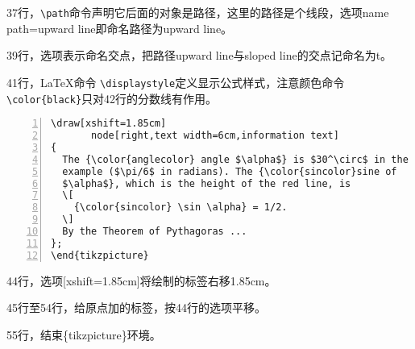 \documentclass[UTF8]{ctexart}
\begin{document}
37行，\verb!\path!命令声明它后面的对象是路径，这里的路径是个线段，选项name path=upward line即命名路径为upward line。

39行，选项表示命名交点，把路径upward line与sloped line的交点记命名为t。

41行，\LaTeX 命令 \verb!\displaystyle!定义显示公式样式，注意颜色命令 \verb!\color{black}!只对42行的分数线有作用。


\begin{lstlisting}[name=example-1,numbers=left,    numberstyle=\footnotesize]
\draw[xshift=1.85cm]
       node[right,text width=6cm,information text]
{
  The {\color{anglecolor} angle $\alpha$} is $30^\circ$ in the
  example ($\pi/6$ in radians). The {\color{sincolor}sine of
  $\alpha$}, which is the height of the red line, is
  \[
    {\color{sincolor} \sin \alpha} = 1/2.
  \]
  By the Theorem of Pythagoras ...
};
\end{tikzpicture}
\end{lstlisting}

44行，选项[xshift=1.85cm]将绘制的标签右移1.85cm。

45行至54行，给原点加的标签，按44行的选项平移。

55行，结束\{tikzpicture\}环境。
\end{document}
